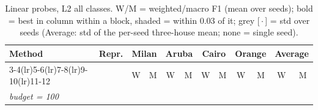 \begin{table}[H]
\centering\small
\caption{Linear probes, L2 all classes. W/M = weighted/macro F1 (mean over seeds); bold = best in column within a block, shaded = within 0.03 of it; grey [\,$\cdot$\,] = std over seeds (Average: std of the per-seed three-house mean; none = single seed).}
\label{tab:probe_l2_all}
\setlength{\tabcolsep}{3.2pt}
\begin{tabular}{llcc|cc|cc|cc|cc}
\toprule
Method & Repr. & \multicolumn{2}{c}{Milan} & \multicolumn{2}{c}{Aruba} & \multicolumn{2}{c}{Cairo} & \multicolumn{2}{c}{Orange} & \multicolumn{2}{c}{Average} \\
\cmidrule(lr){3-4}\cmidrule(lr){5-6}\cmidrule(lr){7-8}\cmidrule(lr){9-10}\cmidrule(lr){11-12}
 & & W & M & W & M & W & M & W & M & W & M \\
\midrule
\multicolumn{12}{l}{\textit{budget = 100}} \\
\midrule

\end{tabular}
\end{table}
